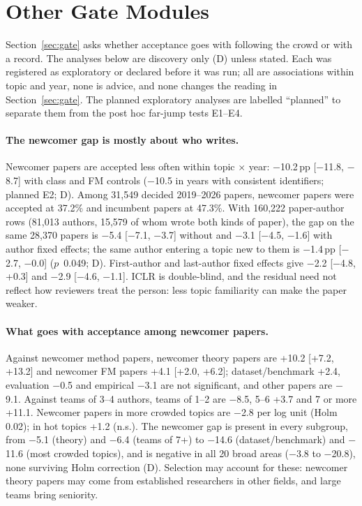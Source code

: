 \FloatBarrier
\section{Other Gate Modules}\label{app:gate}

Section~\ref{sec:gate} asks whether acceptance goes with following the crowd or with a record. The analyses below are discovery
only (D) unless stated. Each was registered as exploratory or declared before it was run; all are associations within
topic and year, none is advice, and none changes the reading in Section~\ref{sec:gate}. The planned exploratory analyses are labelled ``planned'' to
separate them from the post hoc far-jump tests E1--E4.

\paragraph{The newcomer gap is mostly about who writes.} Newcomer papers are accepted less often within topic
$\times$ year: $-$10.2\,pp [$-$11.8, $-$8.7] with class and FM controls ($-$10.5 in years with consistent identifiers;
planned E2; D). Among 31,549 decided 2019--2026 papers, newcomer papers were accepted at 37.2\% and incumbent papers at
47.3\%. With 160,222 paper-author rows (81,013 authors, 15,579 of whom wrote both kinds of paper), the gap on the same
28,370 papers is $-$5.4 [$-$7.1, $-$3.7] without and $-$3.1 [$-$4.5, $-$1.6] with author fixed effects; the same
author entering a topic new to them is $-$1.4\,pp [$-$2.7, $-$0.0] ($p$~0.049; D). First-author and last-author fixed
effects give $-$2.2 [$-$4.8, +0.3] and $-$2.9 [$-$4.6, $-$1.1]. ICLR is double-blind, and the residual need not
reflect how reviewers treat the person: less topic familiarity can make the paper weaker.

\paragraph{What goes with acceptance among newcomer papers.} Against newcomer method papers, newcomer theory papers are
+10.2 [+7.2, +13.2] and newcomer FM papers +4.1 [+2.0, +6.2]; dataset/benchmark +2.4, evaluation $-$0.5 and
empirical $-$3.1 are not significant, and other papers are $-$9.1. Against teams of 3--4 authors, teams of 1--2 are
$-$8.5, 5--6 +3.7 and 7 or more +11.1. Newcomer papers in more crowded topics are $-$2.8 per log unit (Holm 0.02);
in hot topics +1.2 (n.s.). The newcomer gap is present in every subgroup, from $-$5.1 (theory) and $-$6.4 (teams of
7+) to $-$14.6 (dataset/benchmark) and $-$11.6 (most crowded topics), and is negative in all 20 broad areas
($-$3.8 to $-$20.8), none surviving Holm correction (D). Selection may account for these: newcomer theory papers may come
from established researchers in other fields, and large teams bring seniority.

